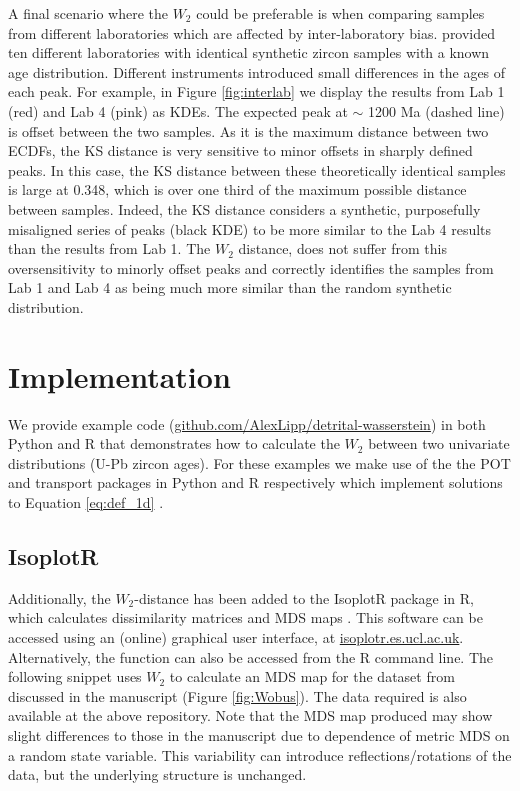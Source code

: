 \documentclass[gchron, manuscript]{copernicus}
\begin{document}
A final scenario where the $W_2$ could be preferable is when comparing samples from different laboratories which are affected by inter-laboratory bias. \citet{kosler_u-pb_2013} provided ten different laboratories with identical synthetic zircon samples with a known age distribution. Different instruments introduced small differences in the ages of each peak. For example, in Figure \ref{fig:interlab} we display the results from Lab 1 (red) and Lab 4 (pink) as KDEs. The expected peak at $\sim$ 1200 Ma (dashed line) is offset between the two samples. As it is the maximum distance between two ECDFs, the KS distance is very sensitive to minor offsets in sharply defined peaks. In this case, the KS distance between these theoretically identical samples is large at 0.348, which is over one third of the maximum possible distance between samples. Indeed, the KS distance considers a synthetic, purposefully misaligned series of peaks (black KDE) to be more similar to the Lab 4 results than the results from Lab 1. The $W_2$ distance, does not suffer from this oversensitivity to minorly offset peaks and correctly identifies the samples from Lab 1 and Lab 4 as being much more similar than the random synthetic distribution.   

\section{Implementation} 

We provide example code (\href{https://github.com/AlexLipp/detrital-wasserstein}{\url{github.com/AlexLipp/detrital-wasserstein}}) in both Python and R that demonstrates how to calculate the $W_2$ between two univariate distributions (U-Pb zircon ages). For these examples we make use of the the {\sf POT} and {\sf transport} packages in Python and R respectively which implement solutions to Equation \ref{eq:def_1d} \citep{flamary_pot_2021,schuhmacher_transport_2022}.

\subsection{IsoplotR}

Additionally, the $W_2$-distance has been added to the IsoplotR package in R, which calculates dissimilarity matrices and MDS maps \citep{vermeesch_isoplotr_2018}. This software can  be accessed using an (online) graphical user interface, at \href{https://isoplotr.es.ucl.ac.uk/}{\url{isoplotr.es.ucl.ac.uk}}. Alternatively, the function can also be accessed from the R command line. The following snippet uses $W_2$ to calculate an MDS map for the dataset from \citet{wobus_has_2003} discussed in the manuscript (Figure \ref{fig:Wobus}). The data required is also available at the above repository. Note that the MDS map produced may show slight differences to those in the manuscript due to dependence of metric MDS on a random state variable. This variability can introduce reflections/rotations of the data, but the underlying structure is unchanged.
\end{document}
